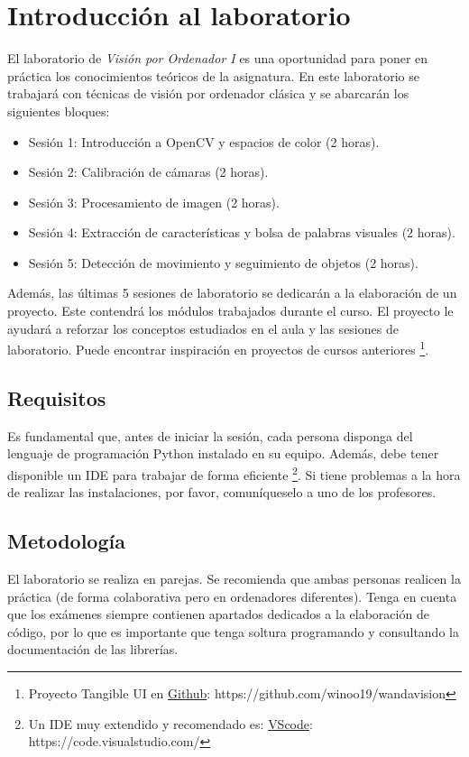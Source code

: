 \chapter{Introducción al laboratorio}
\label{chapter:introduction_lab}

El laboratorio de \textit{Visión por Ordenador I} es una oportunidad para poner en práctica los conocimientos teóricos de la asignatura. En este laboratorio se trabajará con técnicas de visión por ordenador clásica y se abarcarán los siguientes bloques: 

\begin{itemize}
    \item Sesión 1: Introducción a OpenCV y espacios de color (2 horas).
    \item Sesión 2: Calibración de cámaras (2 horas).
    \item Sesión 3: Procesamiento de imagen  (2 horas).
    \item Sesión 4: Extracción de características y bolsa de palabras visuales (2 horas).
    \item Sesión 5: Detección de movimiento y seguimiento de objetos (2 horas).
\end{itemize}

Además, las últimas 5 sesiones de laboratorio se dedicarán a la elaboración de un proyecto. Este contendrá los módulos trabajados durante el curso. El proyecto le ayudará a reforzar los conceptos estudiados en el aula y las sesiones de laboratorio. Puede encontrar inspiración en proyectos de cursos anteriores \footnote{Proyecto Tangible UI en \href{https://github.com/winoo19/wandavision}{Github}: https://github.com/winoo19/wandavision}.


\section{Requisitos}
Es fundamental que, antes de iniciar la sesión, cada persona disponga del lenguaje de programación Python instalado en su equipo. Además, debe tener disponible un IDE para trabajar de forma eficiente \footnote{Un IDE muy extendido y recomendado es: \href{https://code.visualstudio.com/}{VScode}: https://code.visualstudio.com/}. Si tiene problemas a la hora de realizar las instalaciones, por favor, comuníqueselo a uno de los profesores.

\section{Metodología}
El laboratorio se realiza en parejas. Se recomienda que ambas personas realicen la práctica (de forma colaborativa pero en ordenadores diferentes). Tenga en cuenta que los exámenes siempre contienen apartados dedicados a la elaboración de código, por lo que es importante que tenga soltura programando y consultando la documentación de las librerías. 

